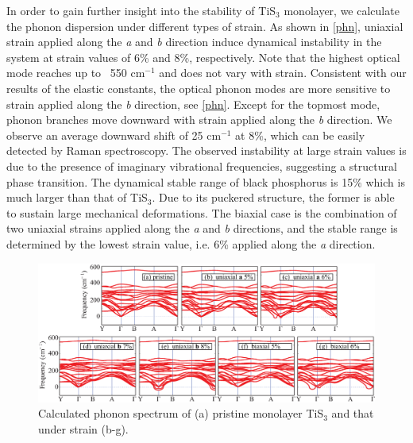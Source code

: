 In order to gain further insight into the stability of TiS$_3$ monolayer, we calculate the phonon dispersion under different types of strain. As shown in \autoref{phn},  uniaxial strain applied along the \textit{a} and \textit{b} direction induce dynamical instability in the system at strain values of 6\% and 8\%, respectively.  Note that the highest optical mode reaches up to ~550 cm$^{-1}$ and does not vary with strain. Consistent with our results of the elastic constants, the optical phonon modes are more sensitive to strain applied along the \textit{b} direction, see \autoref{phn}. Except for the topmost mode,  phonon branches move downward with strain applied along the \textit{b} direction.  We observe an average downward shift of 25 cm$^{-1}$ at 8\%, which can be easily detected by Raman spectroscopy.  The observed instability at large strain values is due to the presence of imaginary vibrational frequencies, suggesting a structural phase transition. The dynamical stable range of black phosphorus is 15\% which is much larger than that of TiS$_3$\cite{0953-8984-27-17-175006}.  Due to its puckered structure, the former is able to sustain large mechanical deformations.  The biaxial case is the combination of two uniaxial strains applied along the \textit{a} and \textit{b} directions, and the stable range is determined by the lowest strain value, i.e. 6\% applied along the \textit{a} direction. 

\begin{landscape}
\begin{figure}[htb]
\centering
\includegraphics[width=\linewidth]{Mob_phn.eps}
\caption{Calculated phonon spectrum of (a) pristine monolayer TiS$_3$ and that under strain (b-g). }
\label{phn}
\end{figure}
\end{landscape}

